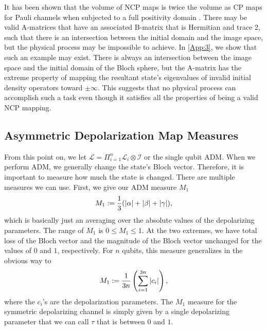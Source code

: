 \documentclass[12pt]{iopart}
\begin{document}
It has been shown that the volume of NCP maps is twice the volume as CP maps for Pauli channels when subjected to a full positivity domain \cite{Jagadish_2019MeasurePauliMaps}. There may be valid A-matrices that have an associated B-matrix that is Hermitian and trace 2, such that there is an intersection between the initial domain and the image space, but the physical process may be impossible to achieve. In \ref{App:3}, we show that such an example may exist. There is always an intersection between the image space and the initial domain of the Bloch sphere, but the A-matrix has the extreme property of mapping the resultant state's eigenvalues of invalid initial density operators toward $\pm \infty$. This suggests that no physical process can accomplish such a task even though it satisfies all the properties of being a valid NCP mapping.

\subsection{Asymmetric Depolarization Map Measures}\label{sec:admmeas}
From this point on, we let $\mathcal{L}=\Pi_{i=1}^n\mathcal{L}_i\otimes \mathcal{I}$ or the single qubit ADM. When we perform ADM, we generally change the state's Bloch vector. Therefore, it is important to measure how much the state is changed. There are multiple measures we can use. First, we give our ADM measure $M_1$
\begin{align}
\label{Eq:M_1_measure}
    M_1:=\dfrac{1}{3}(\abs{\alpha}+\abs{\beta}+\abs{\gamma}),
\end{align}
which is basically just an averaging over the absolute values of the depolarizing parameters. The range of $M_1$ is $0\le M_1\le 1$. At the two extremes, we have total loss of the Bloch vector and the magnitude of the Bloch vector unchanged for the values of $0$ and $1$, respectively. For $n$ qubits, this measure generalizes in the obvious way to
\begin{align}\label{Eq:M_1_measuregeneral}
    M_1:=\dfrac{1}{3n}\left(\sum_{i=1}^{3n}\abs{c_i}\right),
\end{align}
where the $c_i$'s are the depolarization parameters. The $M_1$ measure for the symmetric depolarizing channel is simply given by a single depolarizing parameter that we can call $\tau$ that is between $0$ and $1$.
\end{document}
